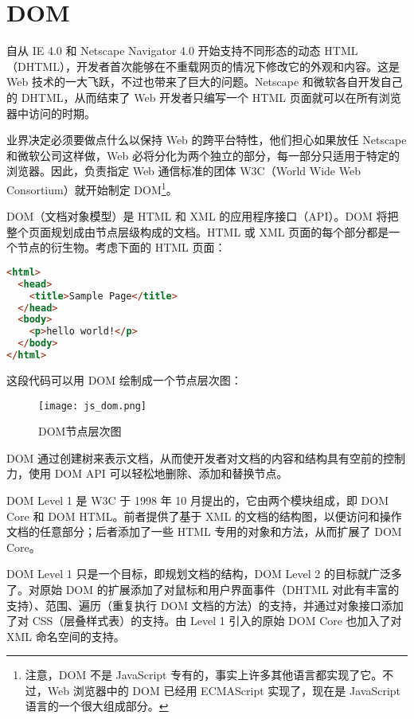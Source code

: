 \chapter{DOM}



自从 IE 4.0 和 Netscape Navigator 4.0 开始支持不同形态的动态 HTML（DHTML），开发者首次能够在不重载网页的情况下修改它的外观和内容。这是 Web 技术的一大飞跃，不过也带来了巨大的问题。Netscape 和微软各自开发自己的 DHTML，从而结束了 Web 开发者只编写一个 HTML 页面就可以在所有浏览器中访问的时期。

业界决定必须要做点什么以保持 Web 的跨平台特性，他们担心如果放任 Netscape 和微软公司这样做，Web 必将分化为两个独立的部分，每一部分只适用于特定的浏览器。因此，负责指定 Web 通信标准的团体 W3C（World Wide Web Consortium）就开始制定 DOM\footnote{注意，DOM 不是 JavaScript 专有的，事实上许多其他语言都实现了它。不过，Web 浏览器中的 DOM 已经用 ECMAScript 实现了，现在是 JavaScript 语言的一个很大组成部分。}。

DOM（文档对象模型）是 HTML 和 XML 的应用程序接口（API）。DOM 将把整个页面规划成由节点层级构成的文档。HTML 或 XML 页面的每个部分都是一个节点的衍生物。考虑下面的 HTML 页面：


\begin{lstlisting}[language=HTML]
<html>
  <head>
    <title>Sample Page</title>
  </head>
  <body>
    <p>hello world!</p>
  </body>
</html>
\end{lstlisting}

这段代码可以用 DOM 绘制成一个节点层次图：


\begin{figure}[!h]
\centering
\texttt{[image: js\_dom.png]}
\vspace{-10pt}
\caption{DOM节点层次图}
\label{js_dom}
\end{figure}

DOM 通过创建树来表示文档，从而使开发者对文档的内容和结构具有空前的控制力，使用 DOM API 可以轻松地删除、添加和替换节点。

DOM Level 1 是 W3C 于 1998 年 10 月提出的，它由两个模块组成，即 DOM Core 和 DOM HTML。前者提供了基于 XML 的文档的结构图，以便访问和操作文档的任意部分；后者添加了一些 HTML 专用的对象和方法，从而扩展了 DOM Core。

DOM Level 1 只是一个目标，即规划文档的结构，DOM Level 2 的目标就广泛多了。对原始 DOM 的扩展添加了对鼠标和用户界面事件（DHTML 对此有丰富的支持）、范围、遍历（重复执行 DOM 文档的方法）的支持，并通过对象接口添加了对 CSS（层叠样式表）的支持。由 Level 1 引入的原始 DOM Core 也加入了对 XML 命名空间的支持。


